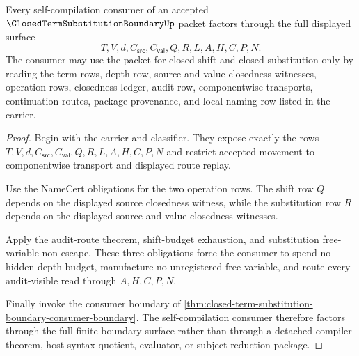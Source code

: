 \begin{theorem}
\label{thm:closed-term-substitution-boundary-consumer-factorization}
Every self-compilation consumer of an accepted $\ClosedTermSubstitutionBoundaryUp$ packet factors through the full displayed surface
$$
T,V,d,C_{\mathsf{src}},C_{\mathsf{val}},Q,R,L,A,H,C,P,N.
$$
The consumer may use the packet for closed shift and closed substitution only by reading the term rows, depth row, source and value closedness witnesses, operation rows, closedness ledger, audit row, componentwise transports, continuation routes, package provenance, and local naming row listed in the carrier.
\end{theorem}
\begin{proof}
Begin with the carrier and classifier. They expose exactly the rows $T,V,d,C_{\mathsf{src}},C_{\mathsf{val}},Q,R,L,A,H,C,P,N$ and restrict accepted movement to componentwise transport and displayed route replay.

Use the NameCert obligations for the two operation rows. The shift row $Q$ depends on the displayed source closedness witness, while the substitution row $R$ depends on the displayed source and value closedness witnesses.

Apply the audit-route theorem, shift-budget exhaustion, and substitution free-variable non-escape. These three obligations force the consumer to spend no hidden depth budget, manufacture no unregistered free variable, and route every audit-visible read through $A,H,C,P,N$.

Finally invoke the consumer boundary of \autoref{thm:closed-term-substitution-boundary-consumer-boundary}. The self-compilation consumer therefore factors through the full finite boundary surface rather than through a detached compiler theorem, host syntax quotient, evaluator, or subject-reduction package.
\end{proof}

